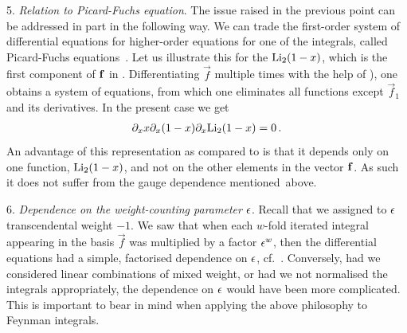 5. {\it Relation to   Picard-Fuchs equation}. The issue raised in the previous point can be addressed in part in the following way. We can trade the first-order system of differential equations for higher-order equations for one of the integrals, called Picard-Fuchs equations~\cite{ch4Muller-Stach:2012tgj}. 
Let us illustrate this for the ${\rm Li}_{2}(1-x)$, which is the first component of ${\bf f}$ in . Differentiating $\vec{f}$ multiple times with the help of ), one obtains a system of equations, from which one eliminates all functions except $\vec{f}_{1}$ and its derivatives.
In the present case we get 
\begin{align}
\partial_x x \partial_x (1-x) \partial_x {\rm Li}_{2}(1-x) = 0\,.
\end{align}
An advantage of this representation as compared to  is that it depends only on one function, ${\rm Li}_{2}(1-x)$, and not on the other elements in the vector ${\bf f}$. As such it does not suffer from the gauge dependence mentioned~above. 

\smallskip

6. {\it Dependence on the weight-counting parameter $\epsilon$}.
Recall that we assigned to $\epsilon$ transcendental weight $-1$.
We saw that when each $w$-fold iterated integral appearing in the basis $\vec{f}$ was multiplied by a factor $\epsilon^w$, then the differential equations had a simple, factorised dependence on $\epsilon$, cf.~. Conversely, had we considered linear combinations of mixed weight, or had we not normalised the integrals appropriately, the dependence on $\epsilon$ would have been more complicated. This is important to bear in mind when applying the above philosophy to Feynman integrals. 
 
 \smallskip 
 
